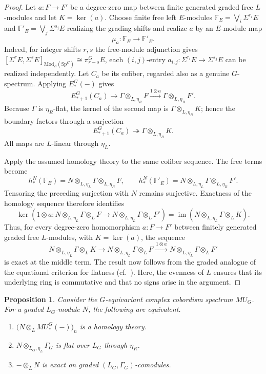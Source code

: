 \documentclass[11pt,reqno]{amsart}
\newtheorem{proposition}[proposition]{Proposition}
\newcommand{\Sp}{\mathrm{Sp}}
\newcommand{\Mod}{\mathrm{Mod}}
\newcommand{\im}{\operatorname{im}}
\newcommand{\tensor}{\otimes}
\begin{document}
\begin{proof}
Let $a:F\to F'$ be a degree-zero map between finite generated graded free $L$-modules and let $K=\ker(a)$.  Choose finite free left $E$-modules $\mathbb F_E = \bigvee_i \Sigma^{r_i} E$ and $\mathbb F'_E =\bigvee_j \Sigma^{s_j} E$ realizing the grading shifts and realize $a$ by an $E$-module map
\[
 \mu_a:\mathbb F_E\longrightarrow\mathbb F'_E.
\]
Indeed, for integer shifts $r,s$ the free-module adjunction gives $[\Sigma^rE,\Sigma^sE]_{\Mod_E(\Sp^G)}\cong\pi_{r-s}^GE$, each $(i,j)$-entry $a_{i,j}:\Sigma^{r_i} E \to \Sigma^{s_j} E$ can be realized independently.  Let $C_a$ be its cofiber, regarded also as a genuine $G$-spectrum.  Applying $E_*^G(-)$ gives
\[
 E_{*+1}^G(C_a)\longrightarrow  \Gamma\tensor_{L,\eta_R} F \xrightarrow{1\tensor a} \Gamma\tensor_{L,\eta_R}F'.
\]
Because $\Gamma$ is $\eta_R$-flat, the kernel of the second map is $\Gamma\tensor_{L,\eta_R}K$; hence the boundary factors through a surjection
\[
 E_{*+1}^G(C_a)\twoheadrightarrow \Gamma\tensor_{L,\eta_R}K.
\]
All maps are $L$-linear through $\eta_L$.

Apply the assumed homology theory to the same cofiber sequence.  The free terms become
\[
 h_*^N(\mathbb F_E)=N\tensor_{L,\eta_L}\Gamma\tensor_{L,\eta_R}F,
 \qquad
 h_*^N(\mathbb F'_E)=N\tensor_{L,\eta_L}\Gamma\tensor_{L,\eta_R}F'.
\]
Tensoring the preceding surjection with $N$ remains surjective.  Exactness of the homology sequence therefore identifies
\[
 \ker(1\tensor a:N\tensor_{L,\eta_L}\Gamma\tensor_LF\to N\tensor_{L,\eta_L}\Gamma\tensor_LF')
 =\im(N\tensor_{L,\eta_L}\Gamma\tensor_LK).
\]
Thus, for every degree-zero homomorphism $a\colon F\to F'$ between finitely generated graded free $L$-modules, with $K=\ker(a)$, the sequence
\[
N\tensor_{L,\eta_L}\Gamma\tensor_L K \longrightarrow N\tensor_{L,\eta_L}\Gamma\tensor_L F \xrightarrow{\,1\tensor a\,} N\tensor_{L,\eta_L}\Gamma\tensor_L F'
\]
is exact at the middle term. The result now follows from the graded analogue of the equational criterion for flatness (cf.~\cite[Lemma 10.39.11]{stacks-project}). Here, the evenness of $L$ ensures that its underlying ring is commutative and that no signs arise in the argument.
\end{proof}

\begin{proposition}\label{thm:first equivalent conditions}
Consider the $G$-equivariant complex cobordism spectrum $MU_G$. For a graded $L_G$-module $N$, the following are equivalent.
\begin{enumerate}
\item $\bigl(N\tensor_L MU_*^G(-)\bigr)_n$ is a homology theory.
\item $N\tensor_{L_G,\eta_L}\Gamma_G$ is flat over $L_G$ through $\eta_R$.
\item $-\tensor_LN$ is exact on graded $(L_G,\Gamma_G)$-comodules.
\end{enumerate}
\end{proposition}
\end{document}
